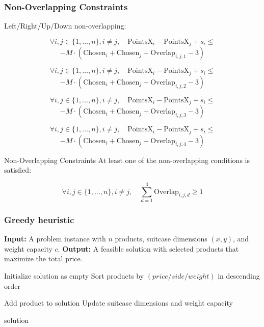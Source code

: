 \documentclass{beamer}
\begin{document}
\begin{frame}
\frametitle{Non-Overlapping Constraints}
Left/Right/Up/Down non-overlapping:


\[
\forall i, j \in \{1, \ldots, n\}, i \neq j, \quad \text{PointsX}_i - \text{PointsX}_j + s_i \leq
\]
\[
-M \cdot (\text{Chosen}_i + \text{Chosen}_j + \text{Overlap}_{i,j,1} - 3)
\]

\[
\forall i, j \in \{1, \ldots, n\}, i \neq j, \quad \text{PointsX}_i - \text{PointsX}_j + s_i \leq
\]
\[
-M \cdot (\text{Chosen}_i + \text{Chosen}_j + \text{Overlap}_{i,j,2} - 3)
\]

\[
\forall i, j \in \{1, \ldots, n\}, i \neq j, \quad \text{PointsX}_i - \text{PointsX}_j + s_i \leq
\]
\[
-M \cdot (\text{Chosen}_i + \text{Chosen}_j + \text{Overlap}_{i,j,3} - 3)
\]

\[
\forall i, j \in \{1, \ldots, n\}, i \neq j, \quad \text{PointsX}_i - \text{PointsX}_j + s_i \leq
\]
\[
-M \cdot (\text{Chosen}_i + \text{Chosen}_j + \text{Overlap}_{i,j,4} - 3)
\]
\end{frame}

\begin{frame}{Non-Overlapping Constraints}
At least one of the non-overlapping conditions is satisfied:

\[
\forall i, j \in \{1, \ldots, n\}, i \neq j, \quad \sum_{d=1}^4 \text{Overlap}_{i,j,d} \geq 1
\]
    
\end{frame}


\begin{frame}[fragile] 
\frametitle{Greedy heuristic}
\begin{algorithm}
\begin{algorithmic}
    \State \textbf{Input:} A problem instance with $n$ products, suitcase dimensions $(x, y)$, and weight capacity $c$.
    \State \textbf{Output:} A feasible solution with selected products that maximize the total price.    

    \State Initialize solution as empty
    \State Sort products by $(price / side / weight)$ in descending order

            \State Add product to solution
            \State Update suitcase dimensions and weight capacity
        \EndIf
    \EndFor

    \State \Return solution
\end{algorithmic}
\end{algorithm}

\end{frame}
\end{document}
